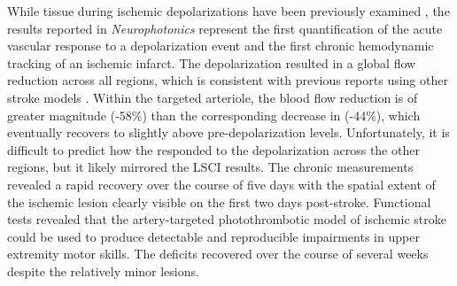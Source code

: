 While tissue  during ischemic depolarizations have been previously examined \cite{vonBornstadt:2015dj}, the results reported in \textit{Neurophotonics} \cite{Sullender:2018ff} represent the first quantification of the acute vascular  response to a depolarization event and the first chronic hemodynamic tracking of an ischemic infarct. The depolarization resulted in a global flow reduction across all regions, which is consistent with previous reports using other stroke models \cite{Shin:2006dc,Nakamura:2010wp}. Within the targeted arteriole, the blood flow reduction is of greater magnitude (-58\%) than the corresponding decrease in  (-44\%), which eventually recovers to slightly above pre-depolarization levels. Unfortunately, it is difficult to predict how the  responded to the depolarization across the other regions, but it likely mirrored the LSCI results. The chronic measurements revealed a rapid recovery over the course of five days with the spatial extent of the ischemic lesion clearly visible on the first two days post-stroke. Functional tests revealed that the artery-targeted photothrombotic model of ischemic stroke could be used to produce detectable and reproducible impairments in upper extremity motor skills. The deficits recovered over the course of several weeks despite the relatively minor lesions.




